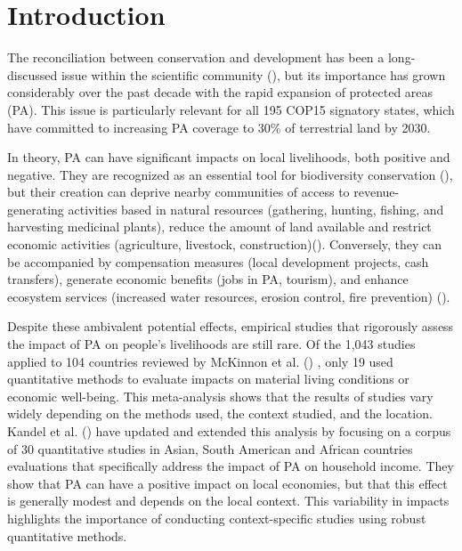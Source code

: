 \documentclass[
]{article}
\begin{document}
\newpage

\section{\texorpdfstring{\textbf{Introduction}}{Introduction}}\label{introduction}

The reconciliation between conservation and development has been a
long-discussed issue within the scientific community
(), but its
importance has grown considerably over the past decade with the rapid
expansion of protected areas (PA). This issue is particularly relevant
for all 195 COP15 signatory states, which have committed to increasing
PA coverage to 30\% of terrestrial land by 2030.

In theory, PA can have significant impacts on local livelihoods, both
positive and negative. They are recognized as an essential tool for
biodiversity conservation
(), but
their creation can deprive nearby communities of access to
revenue-generating activities based in natural resources (gathering,
hunting, fishing, and harvesting medicinal plants), reduce the amount of
land available and restrict economic activities (agriculture, livestock,
construction)(). Conversely, they can be accompanied by compensation measures
(local development projects, cash transfers), generate economic benefits
(jobs in PA, tourism), and enhance ecosystem services (increased water
resources, erosion control, fire prevention)
().

Despite these ambivalent potential effects, empirical studies that
rigorously assess the impact of PA on people's livelihoods are still
rare. Of the 1,043 studies applied to 104 countries reviewed by McKinnon
et al. () , only 19 used
quantitative methods to evaluate impacts on material living conditions
or economic well-being. This meta-analysis shows that the results of
studies vary widely depending on the methods used, the context studied,
and the location. Kandel et al.
() have updated and extended
this analysis by focusing on a corpus of 30 quantitative studies in
Asian, South American and African countries evaluations that
specifically address the impact of PA on household income. They show
that PA can have a positive impact on local economies, but that this
effect is generally modest and depends on the local context. This
variability in impacts highlights the importance of conducting
context-specific studies using robust quantitative methods.
\end{document}
